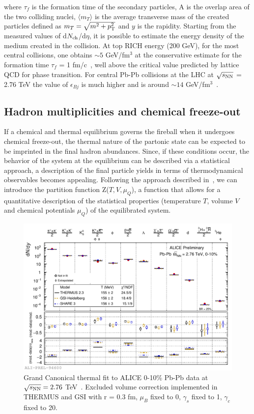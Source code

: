 where $\tau_f$ is the formation time of the secondary particles, A is the overlap area of the two colliding nuclei, $\langle m_T \rangle$ is the average transverse mass of the created particles defined as $m_{T} = \sqrt{m^{2}+p_{\rm T}^2}$ and $y$ is the rapidity. Starting from the measured values of d$N_{\rm ch}$/d$\eta$, it is possible to estimate the energy density of the medium created in the collision.
At top RICH energy (200 GeV), for the most central collisions, one obtains $\sim 5$ GeV/fm$^3$ at the conservative estimate for the formation time $\tau_f$ = 1 fm/c~\cite{Bjorken:1982qr}, well above the critical value predicted by lattice QCD for phase transition. For central Pb-Pb collisions at the LHC at $\sqrt{s_{\rm NN}}$ = 2.76 TeV the value of $\epsilon_{Bj}$ is much higher and is around $\sim 14$ GeV/fm$^3$~\cite{Chatrchyan:2012mb}.

\subsection{Hadron multiplicities and chemical freeze-out}
If a chemical and thermal equilibrium governs the fireball when it undergoes chemical freeze-out, the thermal nature of the partonic state can be expected to be imprinted in the final hadron abundances. Since, if these conditions occur, the behavior of the system at the equilibrium can be described via a statistical approach, a description of the final particle yields in terms of thermodynamical observables becomes appealing. Following the approach described in~\cite{BraunMunzinger:2003zd}, we can introduce the partition function Z($T,V,\mu_{Q}$), a function that allows for a quantitative description of the statistical properties (temperature $T$, volume $V$ and chemical potentials $\mu_{Q}$) of the equilibrated system.
\begin{figure}[!ht]
  \centering
  \includegraphics[width=12cm]{FigCap1/GCThermalFit_PbPb010.pdf}
  \caption{Grand Canonical thermal fit to ALICE 0-10\% Pb-Pb data at $\sqrt{s_{\rm NN}} = 2.76$ TeV~\cite{Floris:2014pta}. Excluded volume correction implemented in THERMUS and GSI with r = 0.3 fm, $\mu_{B}$ fixed to 0, $\gamma_{s}$ fixed to 1, $\gamma_{c}$ fixed to 20. }
  \label{fig:GCThermalFit_PbPb010}
\end{figure}

